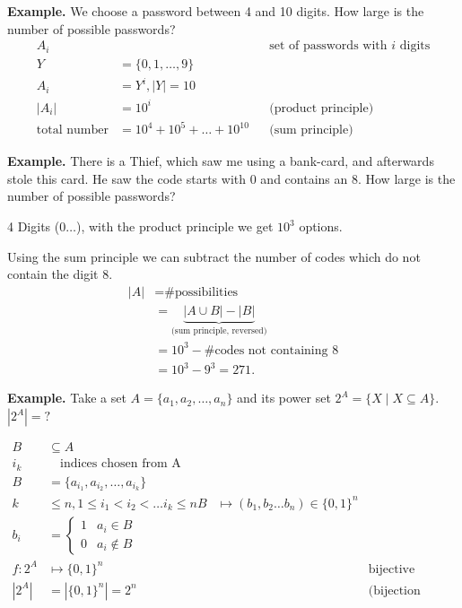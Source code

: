\textbf{Example.}
We choose a password between 4 and 10 digits. How large is the number of possible passwords?
\begin{align*}
  A_i &&& \text{set of passwords with $i$ digits} \\
  Y &= \{0,1,\ldots ,9\} \\
  A_i &= Y^i, |Y| = 10 \\
  |A_i| &= {10}^i  && \text{(product principle)} \\
  \text{total number} &= 10^4 + 10^5 + \ldots + 10^{10} && \text{(sum principle)}
\end{align*}

\textbf{Example.}
There is a Thief, which saw me using a bank-card, and afterwards stole this card. He saw the code starts with $0$ and contains an $8$. How large is the number of possible passwords?

4 Digits ($0 \ldots$), with the product principle we get $10^3$ options.

Using the sum principle we can subtract the number of codes which do not contain the digit $8$.
\begin{align*}
|A| &= \text{\# possibilities} \\
    &= \underbrace{|A\cup B| - |B|}_{\text{(sum principle, reversed)}} \\
    &= {10}^3 - \text{\# codes not containing 8} \\
    &= {10}^3 - 9^3 = 271.
\end{align*}

\textbf{Example.}
Take a set $A = \{a_1, a_2, \ldots , a_n\}$ and its power set $2^A = \{X \mid X
\subseteq A\}$. $|2^A| = ?$

\begin{align*}
  B &\subseteq A \\
  i_k &\quad\text{indices chosen from A} \\
  B &=\{a_{i_1}, a_{i_2},\ldots, a_{i_k}\} \\
  k &\leq n, 1 \leq i_1 < i_2 < \ldots i_k \leq n
    B &\mapsto
    (b_1, b_2 \ldots  b_n) \in \{0,1\}^n \\
  b_i &=
  \begin{cases}
    1 & a_i\in B \\
    0 & a_i\not\in B
  \end{cases} \\
  f: 2^A &\mapsto \{0,1\}^n &&\text{bijective mapping} \\
  |2^A| &= |\{0, 1\}^n| = 2^n
    &&\text{(bijection principle)} \\
\end{align*}

